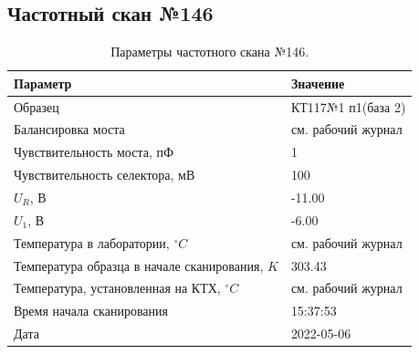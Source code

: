 \subsection{Частотный скан №146}
\begin{table}[!ht]
    \centering
    \caption{Параметры частотного скана №146.}
    \begin{tabular}{|l|l|}
        \hline
        Параметр                                       & Значение                  \\ \hline
        Образец                                        & КТ117№1 п1(база 2)        \\ \hline
        Балансировка моста                             & см. рабочий журнал        \\ \hline
        Чувствительность моста, пФ                     & 1                         \\ \hline
        Чувствительность селектора, мВ                 & 100                       \\ \hline
        $U_R$, В                                       & -11.00                    \\ \hline
        $U_1$, В                                       & -6.00                     \\ \hline
        Температура в лаборатории, $^\circ C$          & см. рабочий журнал        \\ \hline
        Температура образца в начале сканирования, $K$ & 303.43                    \\ \hline
        Температура, установленная на КТХ, $^\circ C$  & см. рабочий журнал        \\ \hline
        Время начала сканирования                      & 15:37:53                  \\ \hline
        Дата                                           & 2022-05-06                \\ \hline
    \end{tabular}
    \label{table:frequency_scan_146}
\end{table}

